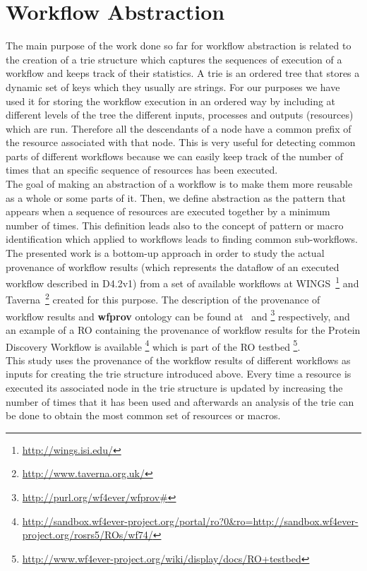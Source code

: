 \section{Workflow Abstraction}

\label{sec:abstraction}
The main purpose of the work done so far for workflow abstraction is related to the creation of a trie structure which captures the sequences of execution of a workflow and keeps track of their statistics. A trie is an ordered tree that stores a dynamic set of keys which they usually are strings. For our purposes we have used it for storing the workflow execution in an ordered way by including at different levels of the tree the different inputs, processes and outputs (resources) which are run. Therefore all the descendants of a node have a common prefix of the resource associated with that node. This is very useful for detecting common parts of different workflows because we can easily keep track of the number of times that an specific sequence of resources has been executed. \\

The goal of making an abstraction of a workflow is to make them more reusable as a whole or some parts of it. Then, we define abstraction as the pattern that appears when a sequence of resources are executed together by a minimum number of times. This definition leads also to the concept of pattern or macro identification which applied to workflows leads to finding common sub-workflows. \\ 

The presented work is a bottom-up approach in order to study the actual provenance of workflow results (which represents the dataflow of an executed workflow described in D4.2v1) from a set of available workflows at WINGS~\footnote{\url{http://wings.isi.edu/}} and Taverna~\footnote{\url{http://www.taverna.org.uk/}} created for this purpose. The description of the provenance of workflow results and \textbf{wfprov} ontology can be found at~\cite{D4.2v1} and \footnote{\url{http://purl.org/wf4ever/wfprov#}} respectively, and an example of a RO containing the provenance of workflow results for the Protein Discovery Workflow is available \footnote{\url{http://sandbox.wf4ever-project.org/portal/ro?0&ro=http://sandbox.wf4ever-project.org/rosrs5/ROs/wf74/}} which is part of the RO testbed \footnote{\url{http://www.wf4ever-project.org/wiki/display/docs/RO+testbed}}. \\


This study uses the provenance of the workflow results of different workflows as inputs for creating the trie structure introduced above. Every time a resource is executed its associated node in the trie structure is updated by increasing the number of times that it has been used and afterwards an analysis of the trie can be done to obtain the most common set of resources or macros. \\
 


